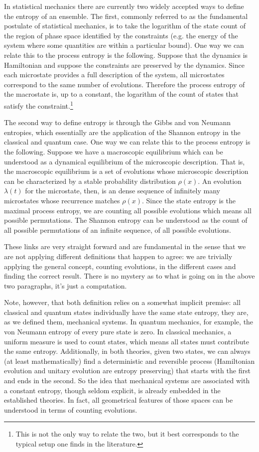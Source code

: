 \documentclass[letterpaper,twocolumn]{article}
\begin{document}
In statistical mechanics there are currently two widely accepted ways to define the entropy of an ensemble. The first, commonly referred to as the fundamental postulate of statistical mechanics, is to take the logarithm of the state count of the region of phase space identified by the constraints (e.g. the energy of the system where some quantities are within a particular bound). One way we can relate this to the process entropy is the following. Suppose that the dynamics is Hamiltonian and suppose the constraints are preserved by the dynamics. Since each microstate provides a full description of the system, all microstates correspond to the same number of evolutions. Therefore the process entropy of the macrostate is, up to a constant, the logarithm of the count of states that satisfy the constraint.\footnote{This is not the only way to relate the two, but it best corresponds to the typical setup one finds in the literature.}

The second way to define entropy is through the Gibbs and von Neumann entropies, which essentially are the application of the Shannon entropy in the classical and quantum case. One way we can relate this to the process entropy is the following. Suppose we have a macroscopic equilibrium which can be understood as a dynamical equilibrium of the microscopic description. That is, the macroscopic equilibrium is a set of evolutions whose microscopic description can be characterized by a stable probability distribution $\rho(x)$. An evolution $\lambda(t)$ for the microstate, then, is an dense sequence of infinitely many microstates whose recurrence matches $\rho(x)$. Since the state entropy is the maximal process entropy, we are counting all possible evolutions which means all possible permutations. The Shannon entropy can be understood as the count of all possible permutations of an infinite sequence, of all possible evolutions.

These links are very straight forward and are fundamental in the sense that we are not applying different definitions that happen to agree: we are trivially applying the general concept, counting evolutions, in the different cases and finding the correct result. There is no mystery as to what is going on in the above two paragraphs, it's just a computation.

Note, however, that both definition relies on a somewhat implicit premise: all classical and quantum states individually have the same state entropy, they are, as we defined them, mechanical systems. In quantum mechanics, for example, the von Neumann entropy of every pure state is zero. In classical mechanics, a uniform measure is used to count states, which means all states must contribute the same entropy. Additionally, in both theories, given two states, we can always (at least mathematically) find a deterministic and reversible process (Hamiltonian evolution and unitary evolution are entropy preserving) that starts with the first and ends in the second. So the idea that mechanical systems are associated with a constant entropy, though seldom explicit, is already embedded in the established theories. In fact, all geometrical features of those spaces can be understood in terms of counting evolutions.
\end{document}

